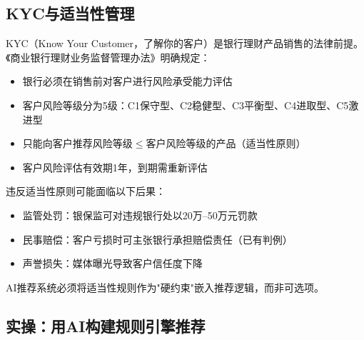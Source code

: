 \subsection{KYC与适当性管理}

KYC（Know Your Customer，了解你的客户）是银行理财产品销售的法律前提。《商业银行理财业务监督管理办法》明确规定：

\begin{itemize}[leftmargin=2em]
  \item 银行必须在销售前对客户进行风险承受能力评估
  \item 客户风险等级分为5级：C1保守型、C2稳健型、C3平衡型、C4进取型、C5激进型
  \item 只能向客户推荐风险等级$\leq$客户风险等级的产品（适当性原则）
  \item 客户风险评估有效期1年，到期需重新评估
\end{itemize}

\begin{warningbox}
违反适当性原则可能面临以下后果：
\begin{itemize}[leftmargin=1em]
  \item 监管处罚：银保监可对违规银行处以20万--50万元罚款
  \item 民事赔偿：客户亏损时可主张银行承担赔偿责任（已有判例）
  \item 声誉损失：媒体曝光导致客户信任度下降
\end{itemize}
AI推荐系统必须将适当性规则作为"硬约束"嵌入推荐逻辑，而非可选项。
\end{warningbox}

\subsection{实操：用AI构建规则引擎推荐}

